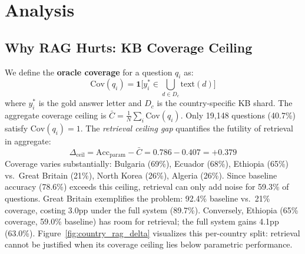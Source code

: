 \documentclass[11pt,a4paper]{article}
\begin{document}
\begin{table}[h]
\centering
\small
{}
\caption{McNemar's paired significance tests across 47,014 questions.}
\label{tab:mcnemar}
\end{table}

\section{Analysis}

\subsection{Why RAG Hurts: KB Coverage Ceiling}
We define the \textbf{oracle coverage} for a question $q_i$ as:
\begin{equation}
    \text{Cov}(q_i) = \mathbf{1}\big[y_i^* \in \bigcup_{d \in D_c} \text{text}(d)\big]
\end{equation}
where $y_i^*$ is the gold answer letter and $D_c$ is the country-specific KB shard. The aggregate coverage ceiling is $\bar{C} = \frac{1}{N}\sum_{i} \text{Cov}(q_i)$. Only 19,148 questions (40.7\%) satisfy $\text{Cov}(q_i) = 1$. The \emph{retrieval ceiling gap} quantifies the futility of retrieval in aggregate:
\begin{equation}
\Delta_{\text{ceil}} = \text{Acc}_{\text{param}} - \bar{C} = 0.786 - 0.407 = +0.379
\end{equation}
Coverage varies substantially: Bulgaria (69\%), Ecuador (68\%), Ethiopia (65\%) vs.\ Great Britain (21\%), North Korea (26\%), Algeria (26\%). Since baseline accuracy (78.6\%) exceeds this ceiling, retrieval can only add noise for 59.3\% of questions. Great Britain exemplifies the problem: 92.4\% baseline vs.\ 21\% coverage, costing 3.0pp under the full system (89.7\%). Conversely, Ethiopia (65\% coverage, 59.0\% baseline) has room for retrieval; the full system gains 4.1pp (63.0\%). Figure~\ref{fig:country_rag_delta} visualizes this per-country split: retrieval cannot be justified when its coverage ceiling lies below parametric performance.
\end{document}
